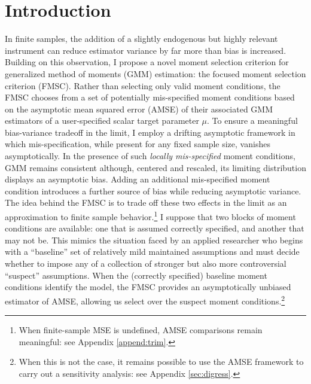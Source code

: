 \section{Introduction}
In finite samples, the addition of a slightly endogenous but highly relevant instrument can reduce estimator variance by far more than bias is increased. 
Building on this observation, I propose a novel moment selection criterion for generalized method of moments (GMM) estimation: the focused moment selection criterion (FMSC). 
Rather than selecting only valid moment conditions, the FMSC chooses from a set of potentially mis-specified moment conditions based on the asymptotic mean squared error (AMSE) of their associated GMM estimators of a user-specified scalar target parameter $\mu$.
To ensure a meaningful bias-variance tradeoff in the limit, I employ a drifting asymptotic framework in which mis-specification, while present for any fixed sample size, vanishes asymptotically.
In the presence of such \emph{locally mis-specified} moment conditions, GMM remains consistent although, centered and rescaled, its limiting distribution displays an asymptotic bias. Adding an additional mis-specified moment condition introduces a further source of bias while reducing asymptotic variance. 
The idea behind the FMSC is to trade off these two effects in the limit as an approximation to finite sample behavior.\footnote{When finite-sample MSE is undefined, AMSE comparisons remain meaningful: see Appendix \ref{append:trim}.}
I suppose that two blocks of moment conditions are available: one that is assumed correctly specified, and another that may not be.
This mimics the situation faced by an applied researcher who begins with a ``baseline'' set of relatively mild maintained assumptions and must decide whether to impose any of a collection of stronger but also more controversial ``suspect'' assumptions.
When the (correctly specified) baseline moment conditions identify the model, the FMSC provides an asymptotically unbiased estimator of AMSE, allowing us select over the suspect moment conditions.\footnote{When this is not the case, it remains possible to use the AMSE framework to carry out a sensitivity analysis: see Appendix \ref{sec:digress}.}


